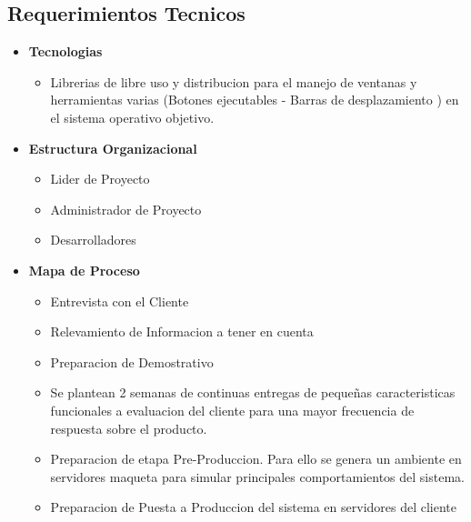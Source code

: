\documentclass[
10pt, %
a4paper, %
oneside, %
headinclude,footinclude, %
BCOR5mm, %
]{scrartcl}
\begin{document}
\subsection{Requerimientos Tecnicos}
\begin{itemize}
  \item \textbf {Tecnologias}
  \begin{itemize}
    \item Librerias de libre uso y distribucion para el manejo de ventanas
          y herramientas varias (Botones ejecutables - Barras de desplazamiento )
          en el sistema operativo objetivo.
  \end{itemize}

  \item \textbf {Estructura Organizacional}
  \begin{itemize}
    \item Lider de Proyecto
    \item Administrador de Proyecto
    \item Desarrolladores
  \end{itemize}

  \item \textbf {Mapa de Proceso}
  \begin{itemize}
    \item Entrevista con el Cliente
    \item Relevamiento de Informacion a tener en cuenta
    \item Preparacion de Demostrativo
    \item Se plantean 2 semanas de continuas entregas de
            pequeñas caracteristicas funcionales a evaluacion
            del cliente para una mayor frecuencia de respuesta
            sobre el producto.

    \item Preparacion de etapa Pre-Produccion. Para ello se genera un ambiente
            en servidores maqueta para simular principales
            comportamientos del sistema.

    \item Preparacion de Puesta a Produccion del sistema en servidores del cliente
  \end{itemize}
\end{itemize}
\end{document}
